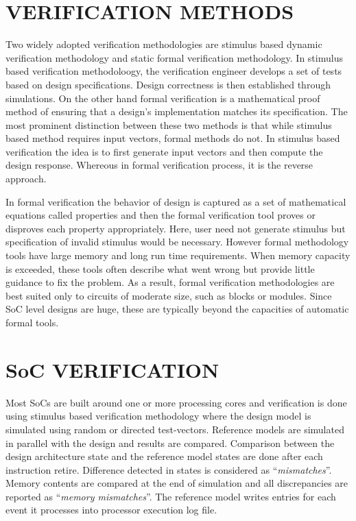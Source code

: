\section{VERIFICATION METHODS}
Two widely adopted verification methodologies are stimulus based dynamic verification methodology and static formal verification methodology. In stimulus based verification methodoloogy, the verification engineer develops a set of tests based on design specifications. Design correctness is then established through simulations. On the other hand formal verification is a mathematical proof method of ensuring that a design's implementation matches its specification\cite{ieee:segev:2004}. The most prominent distinction between these two methods is that while stimulus based method requires input vectors, formal methods do not. In stimulus based verification the idea is to first generate input vectors and then compute the design response. Whereous in formal verification process, it is the reverse approach.

In formal verification the behavior of design is captured as a set of mathematical equations called properties and then the formal verification tool proves or disproves each property appropriately. Here, user need not generate stimulus but specification of invalid stimulus would be necessary. However formal methodology tools have large memory and long run time requirements. When memory capacity is exceeded, these tools often describe what went wrong but provide little guidance to fix the problem. As a result, formal verification methodologies are best suited only to circuits of moderate size, such as blocks or modules. Since SoC level designs are huge, these are typically beyond the capacities of automatic formal tools\cite{ieee:formal:2004}. 

\section{SoC VERIFICATION}
Most SoCs are built around one or more processing cores and verification is done using stimulus based verification methodology where the design model is simulated using random or directed test-vectors. Reference models are simulated in parallel with the design and results are compared.  Comparison between the design architecture state and the reference model states are done after each instruction retire. Difference detected in states is considered as ``{\it mismatches}''. Memory contents are compared at the end of simulation and all discrepancies are reported as ``{\it memory mismatches}''.  The reference model writes entries for each event it processes into processor execution log file.

